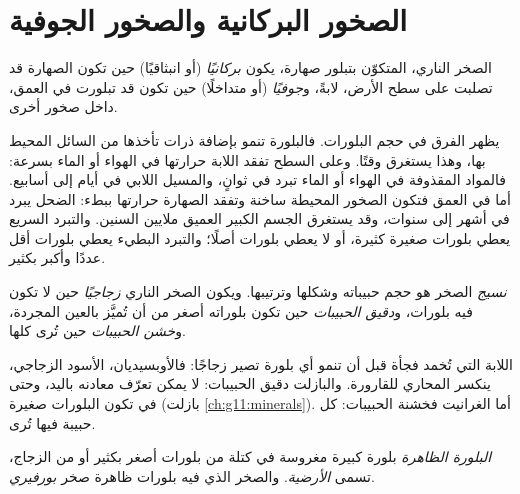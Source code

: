 \section{الصخور البركانية والصخور الجوفية}

\begin{definition}\label{def:g11:igneous-rocks:volcanic-plutonic}
الصخر الناري، المتكوّن بتبلور صهارة، يكون
\emph{بركانيًا}
(أو انبثاقيًا) حين تكون الصهارة قد تصلبت على سطح الأرض، لابةً،
و\emph{جوفيًا} (أو متداخلًا) حين تكون قد تبلورت
في العمق، داخل صخور أخرى.
\end{definition}

يظهر الفرق في حجم البلورات. فالبلورة تنمو بإضافة
ذرات تأخذها من السائل المحيط بها، وهذا يستغرق وقتًا. وعلى السطح
تفقد اللابة حرارتها في الهواء أو الماء بسرعة: فالمواد المقذوفة في الهواء أو
الماء تبرد في ثوانٍ، والمسيل اللابي في أيام إلى أسابيع. أما في العمق فتكون
الصخور المحيطة ساخنة وتفقد الصهارة حرارتها ببطء: 
الضحل يبرد في أشهر إلى سنوات، وقد يستغرق الجسم الكبير العميق ملايين
السنين. والتبرد السريع يعطي بلورات صغيرة كثيرة، أو لا يعطي بلورات أصلًا؛ والتبرد البطيء
يعطي بلورات أقل عددًا وأكبر بكثير.

\begin{definition}[النسيج]\label{def:g11:igneous-rocks:texture}
\emph{نسيج} الصخر هو حجم حبيباته وشكلها
وترتيبها. ويكون الصخر الناري \emph{زجاجيًا} حين
لا تكون فيه بلورات، و\emph{دقيق الحبيبات} حين تكون بلوراته أصغر من أن
تُميَّز بالعين المجردة، و\emph{خشن الحبيبات} حين تُرى
كلها.
\end{definition}

اللابة التي تُخمد فجأة قبل أن تنمو أي بلورة تصير زجاجًا: فالأوبسيديان، الأسود
الزجاجي، ينكسر  المحاري للقارورة. والبازلت
دقيق الحبيبات: لا يمكن تعرّف معادنه باليد، وحتى في
 تكون البلورات صغيرة (بازلت \cref{ch:g11:minerals}).
أما الغرانيت   فخشنة الحبيبات: كل حبيبة فيها تُرى.

\begin{definition}\label{def:g11:igneous-rocks:porphyritic}
\emph{البلورة الظاهرة} بلورة كبيرة مغروسة في كتلة من
بلورات أصغر بكثير أو من الزجاج، تسمى \emph{الأرضية}. والصخر الذي فيه
بلورات ظاهرة صخر \emph{بورفيري}.
\end{definition}

